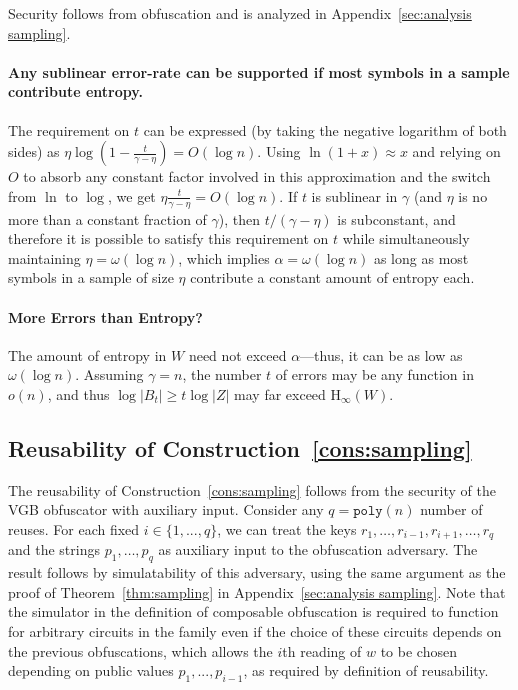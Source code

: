 \documentclass[11pt]{article}
\newcommand{\apref}[1]{\mbox{Appendix~\ref{#1}}}
\newcommand{\consref}[1]{\mbox{Construction~\ref{#1}}}
\newcommand{\poly}{\ensuremath{\mathtt{poly}}\xspace}
\newcommand{\Hoo}{\mathrm{H}_\infty}
\newcommand{\subsetEntropy}{\alpha}
\begin{document}
Security follows from obfuscation and is analyzed in \apref{sec:analysis sampling}.
 
\paragraph{Any sublinear error-rate can be supported if most symbols in a sample contribute entropy.}
The requirement on $t$ can be expressed (by taking the negative logarithm of both sides) as $\eta \log  \left(1-\frac{t }{\gamma-\eta}\right) = O (\log n)$. Using $\ln (1+x)\approx x$ and relying on $O$ to absorb any 
constant factor involved in this approximation and the switch from $\ln$ to $\log$, we get $\eta \frac{t }{\gamma-\eta} = O(\log n)$. If $t$ is sublinear in $\gamma$
 (and $\eta$ is no more than a constant fraction of $\gamma$), then $t/(\gamma-\eta)$ is subconstant, and therefore it is possible to satisfy this requirement on $t$ while simultaneously maintaining $\eta = \omega (\log n)$, which implies $\subsetEntropy = \omega(\log n)$ as long as most symbols in a sample of size $\eta$ contribute a constant amount of entropy each.
 
\paragraph{More Errors than Entropy?}
The amount of entropy in $W$ need not exceed $\subsetEntropy$---thus, it can be as low as $\omega(\log n)$. Assuming $\gamma = n$, the number $t$ of errors may be any function in $o(n)$, and thus $\log |B_t| \ge t \log |Z|$ may far exceed $\Hoo(W)$.


\subsection{Reusability of \consref{cons:sampling}}
The reusability of \consref{cons:sampling} follows from the security of the VGB obfuscator with auxiliary input. Consider any $q = \poly(n)$ number of reuses.  For each fixed $i\in \{1,..., q\}$, we can treat the keys $r_1,\dots, r_{i-1}, r_{i+1}, \dots, r_q$ and the strings $p_1, \dots, p_q$ as auxiliary input to the obfuscation adversary. The result follows by simulatability of this adversary, using the same argument as the proof of Theorem~\ref{thm:sampling} in \apref{sec:analysis sampling}. Note that the simulator in the definition of composable obfuscation is required to function for arbitrary circuits in the family even if the choice of these circuits depends on the previous obfuscations, which allows the $i$th reading of $w$ to be chosen depending on public values $p_1,..., p_{i-1}$, as required by definition of reusability.
\end{document}
